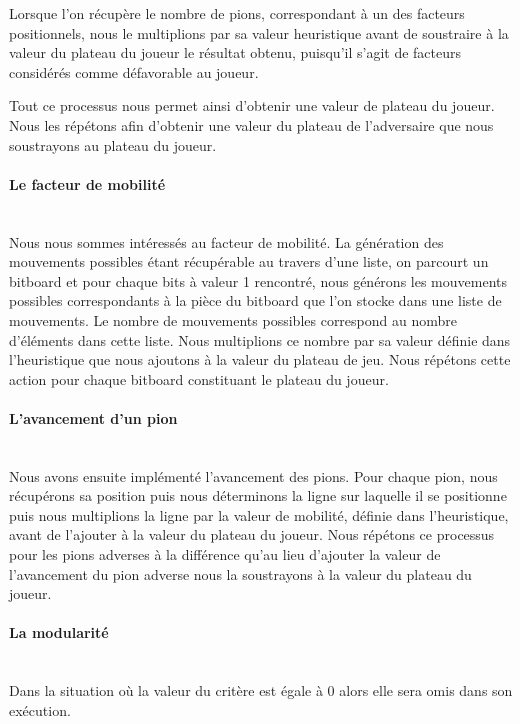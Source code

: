 \huge\documentclass{article}
\begin{document}
    Lorsque l'on récupère le nombre de pions, correspondant à un des facteurs positionnels, nous le multiplions par sa valeur heuristique avant de soustraire à la valeur du plateau du joueur le résultat obtenu, puisqu'il s'agit de facteurs considérés comme défavorable au joueur.
    \newline

    Tout ce processus nous permet ainsi d'obtenir une valeur de plateau du joueur. Nous les répétons afin d'obtenir une valeur du plateau de l'adversaire que nous soustrayons au plateau du joueur.

    \paragraph{Le facteur de mobilité}
    ~~\\
    Nous nous sommes intéressés au facteur de mobilité. La génération des mouvements possibles étant récupérable au travers d'une liste, on parcourt un bitboard et pour chaque bits à valeur 1 rencontré, nous générons les mouvements possibles correspondants à la pièce du bitboard que l'on stocke dans une liste de mouvements. Le nombre de mouvements possibles correspond au nombre d'éléments dans cette liste.
    Nous multiplions ce nombre par sa valeur définie dans l'heuristique que nous ajoutons à la valeur du plateau de jeu. Nous répétons cette action pour chaque bitboard constituant le plateau du joueur.

    \paragraph{L'avancement d'un pion}
    ~~\\
    Nous avons ensuite implémenté l'avancement des pions. Pour chaque pion, nous récupérons sa position puis nous déterminons la ligne sur laquelle il se positionne puis nous multiplions la ligne par la valeur de mobilité, définie dans l'heuristique, avant de l'ajouter à la valeur du plateau du joueur. Nous répétons ce processus pour les pions adverses à la différence qu'au lieu d'ajouter la valeur de l'avancement du pion adverse nous la soustrayons à la valeur du plateau du joueur.
    \paragraph{La modularité}
    ~~\\
    Dans la situation où la valeur du critère est égale à 0 alors elle sera omis dans son exécution.
\end{document}
